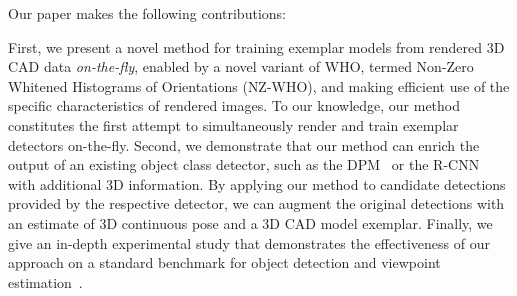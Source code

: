 Our paper makes the following contributions:

First, we present a novel method for training exemplar models from
rendered 3D CAD data {\em on-the-fly}, enabled by a novel variant of
WHO, termed Non-Zero Whitened Histograms of Orientations (NZ-WHO), and making efficient use of the specific
characteristics of rendered images. To our knowledge, our method
constitutes the first attempt to simultaneously render and train
exemplar detectors on-the-fly.
%
Second, we demonstrate that our method can enrich the output of an existing object class
detector, such as the DPM~\cite{Felzenszwalb10} or the
R-CNN~\cite{Girshick14} with additional 3D information. By applying our
method to candidate detections provided by the respective detector, we can augment the original detections with an
estimate of 3D continuous pose and a 3D CAD model exemplar.
%
Finally, we give an in-depth experimental study that demonstrates
the effectiveness of our approach on a standard benchmark for
object detection and viewpoint estimation~\cite{Xiang14}. 

